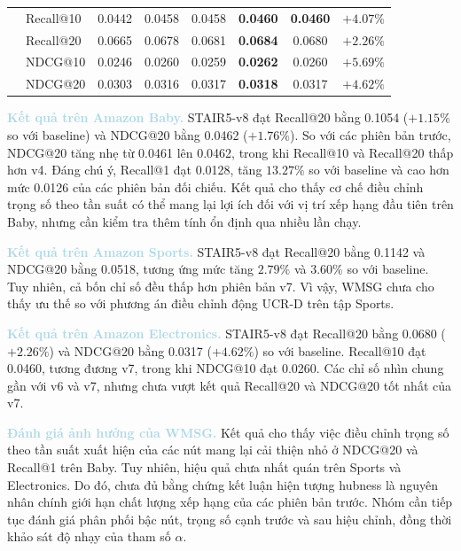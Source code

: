 \begin{table}[!htbp]
{\begin{tabular}{@{}llcccccc@{}}
        & Recall@10 & 0.0442 & 0.0458 & 0.0458 & \textbf{0.0460} & \textbf{0.0460} & $+4.07\%$ \\
        & Recall@20 & 0.0665 & 0.0678 & 0.0681 & \textbf{0.0684} & 0.0680 & $+2.26\%$ \\
        & NDCG@10 & 0.0246 & 0.0260 & 0.0259 & \textbf{0.0262} & 0.0260 & $+5.69\%$ \\
        & NDCG@20 & 0.0303 & 0.0316 & 0.0317 & \textbf{0.0318} & 0.0317 & $+4.62\%$ \\

        \bottomrule
    \end{tabular}%
    }
\end{table}

\noindent\textcolor{lightblue}{\textbf{Kết quả trên Amazon Baby.}} STAIR5-v8 đạt Recall@20 bằng 0.1054 ($+1.15\%$ so với baseline) và NDCG@20 bằng 0.0462 ($+1.76\%$). So với các phiên bản trước, NDCG@20 tăng nhẹ từ 0.0461 lên 0.0462, trong khi Recall@10 và Recall@20 thấp hơn v4. Đáng chú ý, Recall@1 đạt 0.0128, tăng $13.27\%$ so với baseline và cao hơn mức 0.0126 của các phiên bản đối chiếu. Kết quả cho thấy cơ chế điều chỉnh trọng số theo tần suất có thể mang lại lợi ích đối với vị trí xếp hạng đầu tiên trên Baby, nhưng cần kiểm tra thêm tính ổn định qua nhiều lần chạy.

\noindent\textcolor{lightblue}{\textbf{Kết quả trên Amazon Sports.}} STAIR5-v8 đạt Recall@20 bằng 0.1142 và NDCG@20 bằng 0.0518, tương ứng mức tăng $2.79\%$ và $3.60\%$ so với baseline. Tuy nhiên, cả bốn chỉ số đều thấp hơn phiên bản v7. Vì vậy, WMSG chưa cho thấy ưu thế so với phương án điều chỉnh động UCR-D trên tập Sports.

\noindent\textcolor{lightblue}{\textbf{Kết quả trên Amazon Electronics.}} STAIR5-v8 đạt Recall@20 bằng 0.0680 ($+2.26\%$) và NDCG@20 bằng 0.0317 ($+4.62\%$) so với baseline. Recall@10 đạt 0.0460, tương đương v7, trong khi NDCG@10 đạt 0.0260. Các chỉ số nhìn chung gần với v6 và v7, nhưng chưa vượt kết quả Recall@20 và NDCG@20 tốt nhất của v7.

\noindent\textcolor{lightblue}{\textbf{Đánh giá ảnh hưởng của WMSG.}} Kết quả cho thấy việc điều chỉnh trọng số theo tần suất xuất hiện của các nút mang lại cải thiện nhỏ ở NDCG@20 và Recall@1 trên Baby. Tuy nhiên, hiệu quả chưa nhất quán trên Sports và Electronics. Do đó, chưa đủ bằng chứng kết luận hiện tượng hubness là nguyên nhân chính giới hạn chất lượng xếp hạng của các phiên bản trước. Nhóm cần tiếp tục đánh giá phân phối bậc nút, trọng số cạnh trước và sau hiệu chỉnh, đồng thời khảo sát độ nhạy của tham số $\alpha$.


